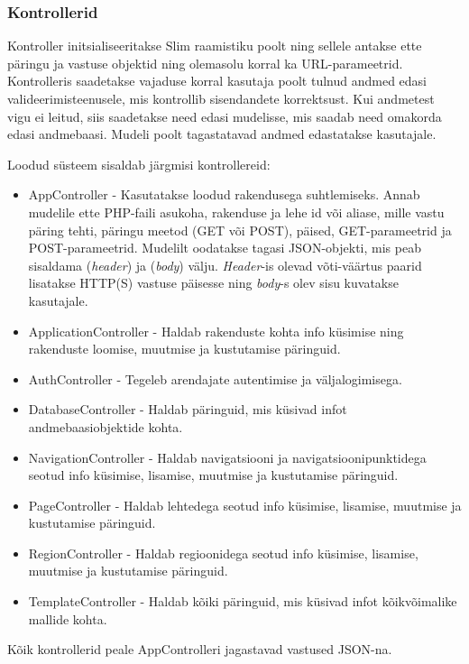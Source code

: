 \documentclass[a4paper,12pt]{article} %
\begin{document}
\subsubsection{Kontrollerid}
Kontroller initsialiseeritakse Slim raamistiku poolt ning sellele antakse ette päringu ja vastuse objektid ning olemasolu korral ka URL-parameetrid. Kontrolleris saadetakse vajaduse korral kasutaja poolt tulnud andmed edasi valideerimisteenusele, mis kontrollib sisendandete korrektsust. Kui andmetest vigu ei leitud, siis saadetakse need edasi mudelisse, mis saadab need omakorda edasi andmebaasi. Mudeli poolt tagastatavad andmed edastatakse kasutajale.\par
Loodud süsteem sisaldab järgmisi kontrollereid:
\begin{itemize}
\item AppController - Kasutatakse loodud rakendusega suhtlemiseks. Annab mudelile ette PHP-faili asukoha, rakenduse ja lehe id või aliase, mille vastu päring tehti, päringu meetod (GET või POST), päised, GET-parameetrid ja POST-parameetrid. Mudelilt oodatakse tagasi JSON-objekti, mis peab sisaldama (\textit{header}) ja (\textit{body}) välju. \textit{Header}-is olevad võti-väärtus paarid lisatakse HTTP(S) vastuse päisesse ning \textit{body}-s olev sisu kuvatakse kasutajale.
\item ApplicationController - Haldab rakenduste kohta info küsimise ning rakenduste loomise, muutmise ja kustutamise päringuid.
\item AuthController - Tegeleb arendajate autentimise ja väljalogimisega.
\item DatabaseController - Haldab päringuid, mis küsivad infot andmebaasiobjektide kohta.
\item NavigationController - Haldab navigatsiooni ja navigatsioonipunktidega seotud info küsimise, lisamise, muutmise ja kustutamise päringuid.
\item PageController - Haldab lehtedega seotud info küsimise, lisamise, muutmise ja kustutamise päringuid.
\item RegionController - Haldab regioonidega seotud info küsimise, lisamise, muutmise ja kustutamise päringuid.
\item TemplateController - Haldab kõiki päringuid, mis küsivad infot kõikvõimalike mallide kohta.
\end{itemize}
Kõik kontrollerid peale AppControlleri jagastavad vastused JSON-na.
\end{document}
